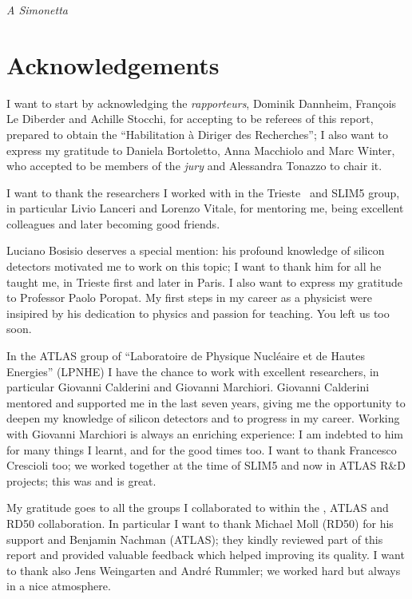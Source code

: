 \vspace*{4cm}
\begin{flushright}
{\itshape A Simonetta
}
\end{flushright}



\chapter*{Acknowledgements}

I want to start by acknowledging the {\it rapporteurs}, Dominik Dannheim, Fran\c{c}ois Le Diberder and Achille Stocchi, for accepting 
to be referees of this  report, prepared to obtain the  ``Habilitation \`a Diriger des Recherches''; I 
also want to express my gratitude to Daniela Bortoletto, Anna Macchiolo and 
Marc Winter, who 
accepted to be members of the {\it jury} and Alessandra Tonazzo to chair it.

I want to thank the researchers I worked with in the Trieste \babar\ and SLIM5 group, 
in particular Livio Lanceri and Lorenzo Vitale, for mentoring me, being excellent colleagues  
and later becoming good friends. 

\noindent Luciano Bosisio deserves a special mention: his profound knowledge of silicon detectors 
 motivated me to work on this topic; I want to thank him for all he taught me, in Trieste first and later 
 in Paris.
I also want  to express my gratitude to Professor Paolo Poropat. My first steps in
my career as a physicist were insipired by his dedication to physics and passion for teaching. You left us too soon.

In the ATLAS group of ``Laboratoire de Physique Nucl\'eaire et de Hautes Energies'' (LPNHE) I have
the chance to work with excellent researchers, in particular Giovanni Calderini and Giovanni Marchiori. 
Giovanni Calderini mentored and supported me in the last seven years, giving me the opportunity  
to deepen my knowledge of silicon detectors and to progress in my career. 
Working with Giovanni Marchiori is  always an enriching experience: I am indebted to him for 
many things I learnt, and for the good times too. 
I want to thank Francesco Crescioli too; we worked together at the time of SLIM5 and now in 
ATLAS R\&D projects; this was and is great. 

My gratitude goes to all the groups I collaborated to within the \babar, ATLAS and RD50 collaboration. 
In particular I want to thank Michael Moll (RD50) for his support and Benjamin Nachman (ATLAS); 
they kindly reviewed part of this report and provided valuable feedback which helped improving its quality. 
I want to thank also Jens Weingarten and Andr\'e Rummler; we worked hard but always in a nice 
atmosphere.
 

